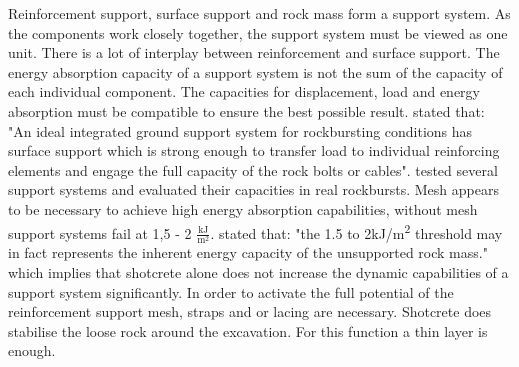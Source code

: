 Reinforcement support, surface support and rock mass form a support system. %
As the components work closely together, the support system must be viewed as one unit. There is a lot of interplay between reinforcement and surface support. The energy absorption capacity of a support system is not the sum of the capacity of each individual component. \autocite[1]{Simser07} The capacities for displacement, load and energy absorption must be compatible to ensure the best possible result. \autocite[222]{Kaiser12} 
\textcite[248]{Heal10} stated that: "An ideal integrated ground support system for rockbursting conditions has surface support which is strong enough to transfer load to individual reinforcing elements and engage the full capacity of the rock bolts or cables".
\textcite{Heal10} tested several support systems and evaluated their capacities in real rockbursts. 
Mesh appears to be necessary to achieve high energy absorption capabilities, without mesh support systems fail at 1,5 - 2 \(\frac{\text{kJ}}{\text{m}^2}\). 
\textcite{Heal10} stated that: "the 1.5 to 2kJ/m\textsuperscript{2} threshold may in fact represents the inherent energy capacity of the unsupported rock mass." which implies that shotcrete alone does not increase the dynamic capabilities of a support system significantly. In order to activate the full potential of the reinforcement support mesh, straps and or lacing are necessary. \autocite[221]{Heal10} 
Shotcrete does stabilise the loose rock around the excavation. For this function a thin layer is enough. \autocite[5]{guler01}

